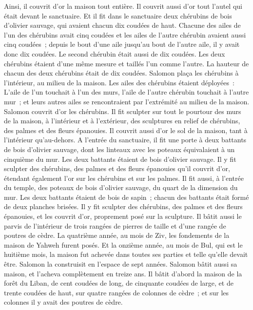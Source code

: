 \begin{multicols}{2}
Ainsi, il couvrit d'or la maison tout entière. Il couvrit aussi d'or tout l'autel qui était devant le sanctuaire.
Et il fit dans le sanctuaire deux chérubins de bois d'olivier sauvage, qui avaient chacun dix coudées de haut.
Chacune des ailes de l'un des chérubins avait cinq coudées et les ailes de l'autre chérubin avaient aussi cinq coudées~; depuis le bout d'une aile jusqu'au bout de l'autre aile, il y avait donc dix coudées.
Le second chérubin était aussi de dix coudées. Les deux chérubins étaient d'une même mesure et taillés l'un comme l'autre.
La hauteur de chacun des deux chérubins était de dix coudées.
Salomon plaça les chérubins à l'intérieur, au milieu de la maison. Les ailes des chérubins étaient déployées~: L'aile de l'un touchait à l'un des murs, l'aile de l'autre chérubin touchait à l'autre mur~; et leurs autres ailes se rencontraient par l'extrémité au milieu de la maison.
Salomon couvrit d'or les chérubins.
Il fit sculpter sur tout le pourtour des murs de la maison, à l'intérieur et à l'extérieur, des sculptures en relief de chérubins, des palmes et des fleurs épanouies.
Il couvrit aussi d'or le sol de la maison, tant à l'intérieur qu'au-dehors.
A l'entrée du sanctuaire, il fit une porte à deux battants de bois d'olivier sauvage, dont les linteaux avec les poteaux équivalaient à un cinquième du mur.
Les deux battants étaient de bois d'olivier sauvage. Il y fit sculpter des chérubins, des palmes et des fleurs épanouies qu'il couvrit d'or, étendant également l'or sur les chérubins et sur les palmes.
Il fit aussi, à l'entrée du temple, des poteaux de bois d'olivier sauvage, du quart de la dimension du mur.
Les deux battants étaient de bois de sapin~; chacun des battants était formé de deux planches brisées.
Il y fit sculpter des chérubins, des palmes et des fleurs épanouies, et les couvrit d'or, proprement posé sur la sculpture.
Il bâtit aussi le parvis de l'intérieur de trois rangées de pierres de taille et d'une rangée de poutres de cèdre.
La quatrième année, au mois de Ziv, les fondements de la maison de Yahweh furent posés.
Et la onzième année, au mois de Bul, qui est le huitième mois, la maison fut achevée dans toutes ses parties et telle qu'elle devait être. Salomon la construisit en l'espace de sept années.
\VerseOne{}Salomon bâtit aussi sa maison, et l'acheva complètement en treize ans.
Il bâtit d'abord la maison de la forêt du Liban, de cent coudées de long, de cinquante coudées de large, et de trente coudées de haut, sur quatre rangées de colonnes de cèdre~; et sur les colonnes il y avait des poutres de cèdre.

\end{multicols}
